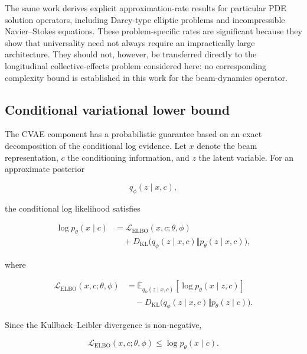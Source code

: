 The same work derives explicit approximation-rate results for particular PDE solution operators, including Darcy-type elliptic problems and incompressible Navier–Stokes equations. These problem-specific rates are significant because they show that universality need not always require an impractically large architecture. They should not, however, be transferred directly to the longitudinal collective-effects problem considered here: no corresponding complexity bound is established in this work for the beam-dynamics operator.

\subsection{Conditional variational lower bound}
\label{sec:auxiliary_theoretical_results_conditional_variational_lower_bound}

The CVAE component has a probabilistic guarantee based on an exact decomposition of the conditional log evidence. Let \(x\) denote the beam representation, \(c\) the conditioning information, and \(z\) the latent variable. For an approximate posterior

\begin{equation}
\label{eq:246}
q_{\phi}(z\mid x,c),
\end{equation}

the conditional log likelihood satisfies

\begin{equation}
\label{eq:247}
\begin{aligned}\log p_{\theta}(x\mid c)&=\mathcal L_{\mathrm{ELBO}}(x,c;\theta,\phi)\\&\quad+D_{\mathrm{KL}}\bigl(q_{\phi}(z\mid x,c)\Vert p_{\theta}(z\mid x,c)\bigr),\end{aligned}
\end{equation}

where

\begin{equation}
\label{eq:248}
\begin{aligned}\mathcal L_{\mathrm{ELBO}}(x,c;\theta,\phi)&=\mathbb E_{q_{\phi}(z\mid x,c)}[\log p_{\theta}(x\mid z,c)]\\&\quad-D_{\mathrm{KL}}\bigl(q_{\phi}(z\mid x,c)\Vert p_{\theta}(z\mid c)\bigr).\end{aligned}
\end{equation}

Since the Kullback–Leibler divergence is non-negative,

\begin{equation}
\label{eq:249}
\mathcal L_{\mathrm{ELBO}}(x,c;\theta,\phi)\le\log p_{\theta}(x\mid c).
\end{equation}

